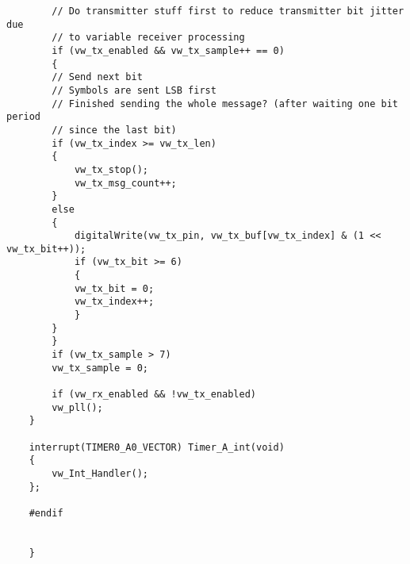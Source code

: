 \begin{verbatim}
        // Do transmitter stuff first to reduce transmitter bit jitter due 
        // to variable receiver processing
        if (vw_tx_enabled && vw_tx_sample++ == 0)
        {
        // Send next bit
        // Symbols are sent LSB first
        // Finished sending the whole message? (after waiting one bit period 
        // since the last bit)
        if (vw_tx_index >= vw_tx_len)
        {
            vw_tx_stop();
            vw_tx_msg_count++;
        }
        else
        {
            digitalWrite(vw_tx_pin, vw_tx_buf[vw_tx_index] & (1 << vw_tx_bit++));
            if (vw_tx_bit >= 6)
            {
            vw_tx_bit = 0;
            vw_tx_index++;
            }
        }
        }
        if (vw_tx_sample > 7)
        vw_tx_sample = 0;
        
        if (vw_rx_enabled && !vw_tx_enabled)
        vw_pll();
    }

    interrupt(TIMER0_A0_VECTOR) Timer_A_int(void) 
    {
        vw_Int_Handler();
    };

    #endif


    }
\end{verbatim}

